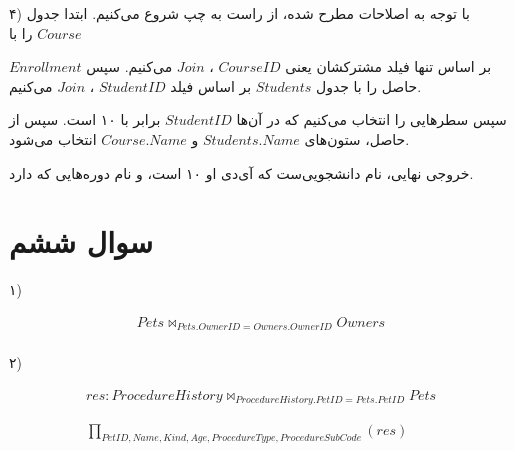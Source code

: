 \bigbreak

۴) با توجه به اصلاحات مطرح شده، از راست به چپ شروع می‌کنیم.
ابتدا جدول
$Course$
را با

$Enrollment$
بر اساس تنها فیلد مشترکشان یعنی
$CourseID$
،
$Join$
می‌کنیم. سپس حاصل را با جدول
$Students$
بر اساس فیلد
$StudentID$
،
$Join$
می‌کنیم.

سپس سطرهایی را انتخاب می‌کنیم که در آن‌ها
$StudentID$
برابر با ۱۰ است.
سپس از حاصل، ستون‌های
$Students.Name$
و
$Course.Name$
انتخاب می‌شود.

خروجی نهایی، نام دانشجویی‌ست که آی‌دی او ۱۰ است، و نام دوره‌هایی که دارد.

\bigbreak

\begin{LTRbibitems}
\end{LTRbibitems}



\section*{\centering سوال ششم}

۱)

\begin{LTRbibitems}
    \begin{gather*}
        Pets \bowtie_{Pets.OwnerID = Owners.OwnerID} Owners
        \\
    \end{gather*}
\end{LTRbibitems}



۲)




\begin{LTRbibitems}
    \begin{gather*}
        res: ProcedureHistory \bowtie_{ProcedureHistory.PetID = Pets.PetID} Pets
        \\
        \\
        \\
        \prod _{PetID, Name, Kind, Age, ProcedureType, ProcedureSubCode} (res)
        \\
    \end{gather*}
\end{LTRbibitems}

